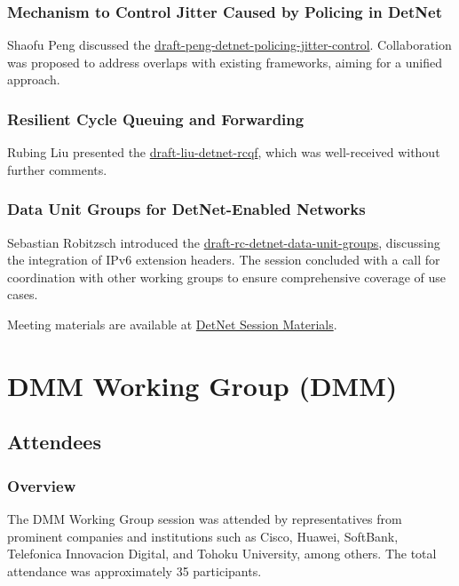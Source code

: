 \documentclass{article}
\begin{document}
\subsubsection{Mechanism to Control Jitter Caused by Policing in DetNet}
Shaofu Peng discussed the \href{https://datatracker.ietf.org/doc/html/draft-peng-detnet-policing-jitter-control}{draft-peng-detnet-policing-jitter-control}. Collaboration was proposed to address overlaps with existing frameworks, aiming for a unified approach.

\subsubsection{Resilient Cycle Queuing and Forwarding}
Rubing Liu presented the \href{https://datatracker.ietf.org/doc/html/draft-liu-detnet-rcqf}{draft-liu-detnet-rcqf}, which was well-received without further comments.

\subsubsection{Data Unit Groups for DetNet-Enabled Networks}
Sebastian Robitzsch introduced the \href{https://datatracker.ietf.org/doc/html/draft-rc-detnet-data-unit-groups}{draft-rc-detnet-data-unit-groups}, discussing the integration of IPv6 extension headers. The session concluded with a call for coordination with other working groups to ensure comprehensive coverage of use cases.

Meeting materials are available at \href{https://datatracker.ietf.org/meeting/121/session/detnet}{DetNet Session Materials}.



\newpage

\section{DMM Working Group (DMM)}

\subsection{Attendees}

\subsubsection{Overview}
The DMM Working Group session was attended by representatives from prominent companies and institutions such as Cisco, Huawei, SoftBank, Telefonica Innovacion Digital, and Tohoku University, among others. The total attendance was approximately 35 participants.
\end{document}
